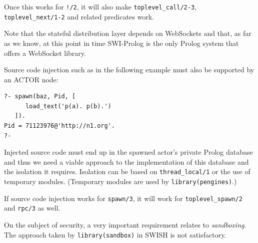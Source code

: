 \noindent Once this works for \texttt{!/2}, it will also make \texttt{toplevel\_call/2-3}, \texttt{toplevel\_next/1-2} and related predicates work. 

Note that the stateful distribution layer depends on WebSockets and that, as far as we know, at this point in time SWI-Prolog is the only Prolog system that offers a WebSocket library.

Source code injection such as in the following example must also be supported by an ACTOR node:

\begin{verbatim}
?- spawn(baz, Pid, [
      load_text('p(a). p(b).')
   ]).
Pid = 71123976@'http://n1.org'.
?-
\end{verbatim}

\noindent Injected source code must end up in the spawned actor's private Prolog database and thus we need a viable approach to the implementation of this database and the isolation it requires. Isolation can be based on \texttt{thread\_local/1} or the use of temporary modules. (Temporary modules are used by \texttt{library(pengines)}.)

If source code injection works for \texttt{spawn/3}, it will work for \texttt{toplevel\_spawn/2} and \texttt{rpc/3} as well.

On the subject of  security, a very important requirement relates to \textit{sandboxing}. The approach taken by \texttt{library(sandbox)} in SWISH is not satisfactory.






%
%
%

